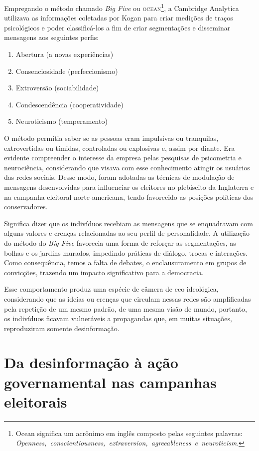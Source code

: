 Empregando o método chamado \textit{Big Five} ou \textsc{ocean}\footnote{Ocean
  significa um acrônimo em inglês composto pelas seguintes palavras: \textit{Openness,~conscientiousness,~extraversion,~agreeableness~e~neuroticism}.},
a Cambridge Analytica utilizava as informações coletadas por Kogan para
criar medições de traços psicológicos e poder classificá-los a fim de criar segmentações e disseminar mensagens aos seguintes perfis:

\begin{enumerate}
\item Abertura (a novas experiências)
\item Consenciosidade (perfeccionismo)
\item Extroversão (sociabilidade)
\item Condescendência (cooperatividade)
\item Neuroticismo (temperamento)
\end{enumerate}

O método permitia saber se as pessoas eram impulsivas ou tranquilas,
extrovertidas ou tímidas, controladas ou explosivas e, assim por diante.
Era evidente compreender o interesse da empresa pelas pesquisas de
psicometria e neurociência, considerando que visava com esse
conhecimento atingir os usuários das redes sociais. Desse modo, foram
adotadas as técnicas de modulação de mensagens desenvolvidas para
influenciar os eleitores no plebiscito da Inglaterra e na campanha
eleitoral norte-americana, tendo favorecido as posições políticas dos
conservadores.

Significa dizer que os indivíduos recebiam as mensagens que se
enquadravam com alguns valores e crenças relacionadas ao seu perfil de
personalidade. A utilização do método do \textit{Big Five} favorecia uma forma de
reforçar as segmentações, as bolhas e os jardins murados, impedindo
práticas de diálogo, trocas e interações. Como consequência, temos a
falta de debates, o enclausuramento em grupos de convicções, trazendo um
impacto significativo para a democracia.

Esse comportamento produz uma espécie de câmera de eco ideológica,
considerando que as ideias ou crenças que circulam nessas redes são
amplificadas pela repetição de um mesmo padrão, de uma mesma visão de
mundo, portanto, os indivíduos ficavam vulneráveis a propagandas que, em
muitas situações, reproduziram somente desinformação.

\section{Da desinformação à ação governamental nas campanhas eleitorais}

